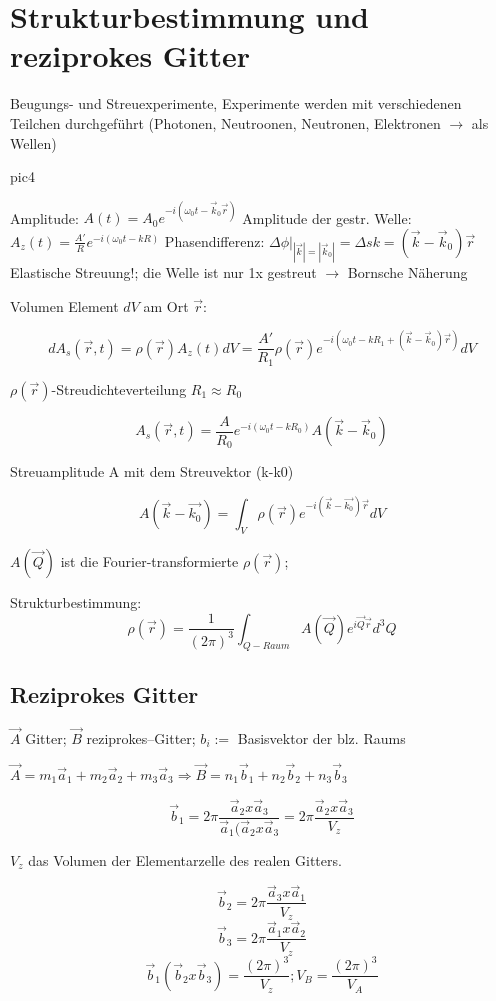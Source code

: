 \chapter{Strukturbestimmung und reziprokes Gitter}


Beugungs- und Streuexperimente, Experimente werden mit verschiedenen Teilchen
durchgeführt (Photonen, Neutroonen, Neutronen, Elektronen \(\rightarrow\) als
Wellen)

pic4

Amplitude: \(A(t)=A_0e^{-i(\omega_0t-\vec k_0\vec r)}\)
Amplitude der gestr. Welle: \( A_z(t)=\frac {A'} R e^{-i(\omega_0t-kR)}\)
Phasendifferenz: \(\left. \Delta\phi \right|_{|\vec k|=|\vec k_0|}=\Delta
s k= (\vec k - \vec k_0)\vec r\)
Elastische Streuung!; die Welle ist nur 1x gestreut \(\rightarrow\) Bornsche
Näherung

Volumen Element \(dV\) am Ort \(\vec r\):

\[dA_s(\vec r,t)=\rho(\vec r)A_z(t)dV=\frac {A'}{R_1}\rho(\vec
r)e^{-i(\omega_0t-kR_1+(\vec k-\vec k_0)\vec r)}dV\] 

\(\rho(\vec r)\)-Streudichteverteilung \(R_1\approx R_0\)

\[A_s(\vec r,t)=\frac {A}{R_0}e^{-i(\omega_0t-kR_0)}A(\vec k-\vec k_0)\]

Streuamplitude A mit dem Streuvektor (k-k0)

\[A(\vec k - \vec {k_0}) = \int_V \rho(\vec r) e^{-i(\vec k -\vec {k_0})\vec r}dV\]

\(A(\vec Q)\) ist die Fourier-transformierte \(\rho(\vec r)\);

Strukturbestimmung:
\[\rho(\vec r) = \frac 1 {(2\pi)^3}\int_{Q-Raum}A(\vec Q) e^{i\vec Q \vec r}
d^3Q\]

\section{Reziprokes Gitter}

\(\vec A\) Gitter;  \(\vec B\) reziprokes--Gitter; \(b_i:=\) Basisvektor der blz.  Raums 

\(\vec A= m_1\vec a_1+m_2\vec a_2 + m_3\vec a_3 \Rightarrow \vec B = n_1\vec b_1+n_2\vec b_2 + n_3\vec b_3 \)

\[\vec b_1 = 2\pi \frac{\vec a_2 x \vec a_3}{\vec a_1(\vec a_2 x \vec a_3}=2\pi
\frac{\vec a_2 x \vec a_3}{V_z}\]

\(V_z\) das Volumen der Elementarzelle des realen Gitters.

\[\vec b_2= 2\pi\frac{\vec a_3 x \vec a_1}{V_z}\]
\[\vec b_3= 2\pi\frac{\vec a_1 x \vec a_2}{V_z}\]
\[\vec b_1(\vec b_2 x \vec b_3)=\frac {(2\pi)^3}{V_z}; V_B=\frac
{(2\pi)^3}{V_A}\]

